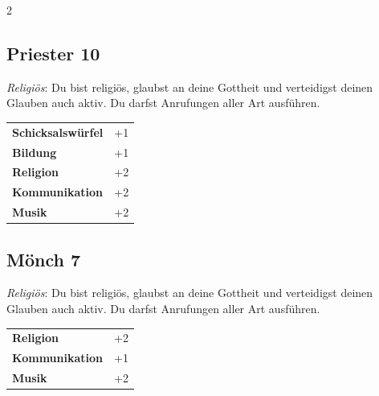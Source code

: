 \begin{multicols}{2}
\begin{tcolorbox}
\end{tcolorbox}

\begin{tcolorbox}
    \subsection*{Priester \hfill \small{10 }}
    \tcblower
\textit{Religiös}: Du bist religiös, glaubst an deine Gottheit und verteidigst deinen Glauben auch aktiv. Du darfst Anrufungen aller Art ausführen.


\vspace{3mm}

\begin{tabular}{@{}ll@{}}
    \textbf{Schicksalswürfel} & +1\\
    \textbf{Bildung} & +1\\
    \textbf{Religion} & +2\\
    \textbf{Kommunikation} & +2\\
    \textbf{Musik} & +2\\
\end{tabular}


\end{tcolorbox}

\begin{tcolorbox}
    \subsection*{Mönch \hfill \small{7 }}
    \tcblower
\textit{Religiös}: Du bist religiös, glaubst an deine Gottheit und verteidigst deinen Glauben auch aktiv. Du darfst Anrufungen aller Art ausführen.


\vspace{3mm}

\begin{tabular}{@{}ll@{}}
    \textbf{Religion} & +2\\
    \textbf{Kommunikation} & +1\\
    \textbf{Musik} & +2\\
\end{tabular}



\end{tcolorbox}
\end{multicols}
